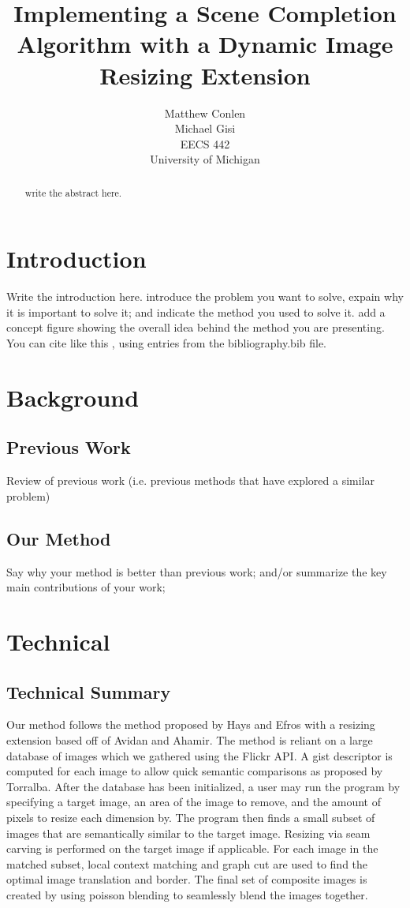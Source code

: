 \documentclass[11pt]{amsart}
\title{Implementing a Scene Completion Algorithm with a Dynamic Image Resizing Extension}
\author{Matthew Conlen \\ Michael Gisi  \\ EECS 442 \\ University of Michigan}
\date{}                                           %
\begin{document}
\maketitle

\begin{abstract}
write the abstract here. 
\end{abstract}

\section{Introduction}

Write the introduction here.  introduce the problem you want to solve, expain why it is important to solve it; and indicate the method you used to solve it. add a concept figure showing the overall idea behind the method you are presenting. You can cite like this \cite{Hays:2007, Karger:1992, Avidan:2007, Torralba:2006, Perez:2003}, using entries from the bibliography.bib file.

\section{Background} 
\subsection{Previous Work}
Review of previous work (i.e. previous methods that have explored a similar problem)

\subsection{Our Method}
Say why your method is better than previous work; and/or summarize the key main contributions of your work; 

\section{Technical}

\subsection{Technical Summary}
Our method follows the method proposed by Hays and Efros\cite{Hays:2007} with a resizing extension based off of Avidan and Ahamir. \cite{Avidan:2007} The method is reliant on a large database of images which we gathered using the Flickr API. A gist descriptor is computed for each image to allow quick semantic comparisons as proposed by Torralba. \cite{Torralba:2006} After the database has been initialized, a user may run the program by specifying a target image, an area of the image to remove, and the amount of pixels to resize each dimension by. The program then finds a small subset of images that are semantically similar to the target image. Resizing via seam carving is performed on the target image if applicable. For each image in the matched subset, local context matching and graph cut are used to find the optimal image translation and border. The final set of composite images is created by using poisson blending to seamlessly blend the images together.
\end{document}
